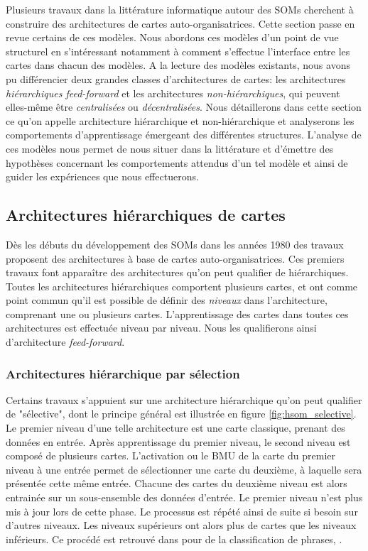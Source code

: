 \documentclass[../main]{subfiles}
\begin{document}
Plusieurs travaux dans la littérature informatique autour des SOMs cherchent à construire des architectures de cartes auto-organisatrices.
Cette section passe en revue certains de ces modèles.
Nous abordons ces modèles d'un point de vue structurel en s'intéressant notamment à comment s'effectue l'interface entre les cartes dans chacun des modèles. A la lecture des modèles existants, nous avons pu différencier deux grandes classes d'architectures de cartes: les architectures \emph{hiérarchiques feed-forward} et  les architectures \emph{non-hiérarchiques}, qui peuvent elles-même être \emph{centralisées} ou \emph{décentralisées}.
Nous détaillerons dans cette section ce qu'on appelle architecture hiérarchique et non-hiérarchique et analyserons les comportements d'apprentissage émergeant des différentes structures. L'analyse de ces modèles nous permet de nous situer dans la littérature et d'émettre des hypothèses concernant les comportements attendus d'un tel modèle et ainsi de guider les expériences que nous effectuerons.

\subsection{Architectures hiérarchiques de cartes}

Dès les débuts du développement des SOMs dans les années 1980 des travaux proposent des architectures à base de cartes auto-organisatrices. Ces premiers travaux font apparaître des architectures qu'on peut qualifier de hiérarchiques.
Toutes les architectures hiérarchiques comportent plusieurs cartes, et ont comme point commun qu'il est possible de définir des \emph{niveaux} dans l'architecture, comprenant une ou plusieurs cartes. L'apprentissage des cartes dans toutes ces architectures est effectuée niveau par niveau. Nous les qualifierons ainsi d'architecture \emph{feed-forward}. 

\subsubsection{Architectures hiérarchique par sélection}

Certains travaux s'appuient sur une architecture hiérarchique qu'on peut qualifier de "sélective", dont le principe général est illustrée en figure \ref{fig:hsom_selective}.
Le premier niveau d'une telle architecture est une carte classique, prenant des données en entrée. Après apprentissage du premier niveau, le second niveau est composé de plusieurs cartes.
L'activation ou le BMU de la carte du premier niveau à une entrée permet de sélectionner une carte du deuxième, à laquelle sera présentée cette même entrée. 
Chacune des cartes du deuxième niveau est alors entrainée sur un sous-ensemble des données d'entrée. 
Le premier niveau n'est plus mis à jour lors de cette phase.
Le processus est répété ainsi de suite si besoin sur d'autres niveaux. Les niveaux supérieurs ont alors plus de cartes que les niveaux inférieurs.
Ce procédé est retrouvé dans \cite{barbalho_hierarchical_2001,suganthan_pattern_2001}
\cite{miikkulainen_script_1992} pour de la classification de phrases, \cite{dittenbach_growing_2000,ordonez_hierarchical_2010,zhao_stacked_2015}. 
\end{document}
